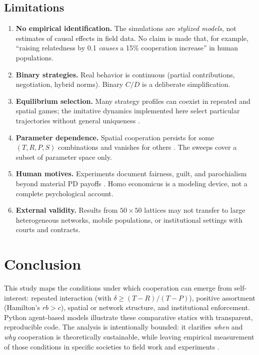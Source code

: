 \documentclass[11pt,a4paper]{article}
\begin{document}
\subsection{Limitations}

\begin{enumerate}[noitemsep]
  \item \textbf{No empirical identification.} The simulations are \emph{stylized models}, not estimates of causal effects in field data. No claim is made that, for example, ``raising relatedness by 0.1 \emph{causes} a 15\% cooperation increase'' in human populations.
  \item \textbf{Binary strategies.} Real behavior is continuous (partial contributions, negotiation, hybrid norms). Binary $C/D$ is a deliberate simplification.
  \item \textbf{Equilibrium selection.} Many strategy profiles can coexist in repeated and spatial games; the imitative dynamics implemented here select particular trajectories without general uniqueness \citep{fudenberg1991,press2012}.
  \item \textbf{Parameter dependence.} Spatial cooperation persists for some $(T,R,P,S)$ combinations and vanishes for others \citep{nowak1992}. The sweeps cover a subset of parameter space only.
  \item \textbf{Human motives.} Experiments document fairness, guilt, and parochialism beyond material PD payoffs \citep{henrich2001,rand2013}. Homo economicus is a modeling device, not a complete psychological account.
  \item \textbf{External validity.} Results from $50 \times 50$ lattices may not transfer to large heterogeneous networks, mobile populations, or institutional settings with courts and contracts.
\end{enumerate}

\section{Conclusion}

This study maps the conditions under which cooperation can emerge from self-interest: repeated interaction (with $\delta \ge (T-R)/(T-P)$), positive assortment (Hamilton's $rb > c$), spatial or network structure, and institutional enforcement. Python agent-based models illustrate these comparative statics with transparent, reproducible code. The analysis is intentionally bounded: it clarifies \emph{when} and \emph{why} cooperation is theoretically sustainable, while leaving empirical measurement of those conditions in specific societies to field work and experiments \citep{ostrom1990,fehr2002,henrich2001}.
\end{document}
